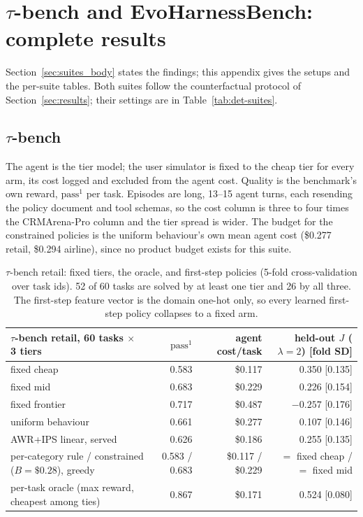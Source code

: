 \documentclass[10pt]{article}
\begin{document}
\section{$\tau$-bench and EvoHarnessBench: complete results}
\label{sec:suites}

Section~\ref{sec:suites_body} states the findings; this appendix gives the setups and the per-suite tables. Both suites follow the counterfactual protocol of Section~\ref{sec:results}; their settings are in Table~\ref{tab:det-suites}.

\subsection{$\tau$-bench}

The agent is the tier model; the user simulator is fixed to the cheap tier for every arm, its cost logged and excluded from the agent cost. Quality is the benchmark's own reward, $\mathrm{pass}^1$ per task. Episodes are long, 13--15 agent turns, each resending the policy document and tool schemas, so the cost column is three to four times the CRMArena-Pro column and the tier spread is wider. The budget for the constrained policies is the uniform behaviour's own mean agent cost (\$0.277 retail, \$0.294 airline), since no product budget exists for this suite.

\begin{table}[htbp]\centering\small
\begin{tabular}{lrrr}\toprule
$\tau$-bench retail, 60 tasks $\times$ 3 tiers & $\mathrm{pass}^1$ & agent cost/task & held-out $J$ ($\lambda=2$) [fold SD] \\\midrule
fixed cheap & 0.583 & \$0.117 & 0.350 [0.135] \\
fixed mid & 0.683 & \$0.229 & 0.226 [0.154] \\
fixed frontier & 0.717 & \$0.487 & $-0.257$ [0.176] \\
uniform behaviour & 0.661 & \$0.277 & 0.107 [0.146] \\
AWR+IPS linear, served & 0.626 & \$0.186 & 0.255 [0.135] \\
per-category rule / constrained ($B=\$0.28$), greedy & 0.583 / 0.683 & \$0.117 / \$0.229 & $=$ fixed cheap / $=$ fixed mid \\
per-task oracle (max reward, cheapest among ties) & 0.867 & \$0.171 & 0.524 [0.080] \\\bottomrule
\end{tabular}
\caption{$\tau$-bench retail: fixed tiers, the oracle, and first-step policies (5-fold cross-validation over task ids). 52 of 60 tasks are solved by at least one tier and 26 by all three. The first-step feature vector is the domain one-hot only, so every learned first-step policy collapses to a fixed arm.}
\label{tab:taubench}
\end{table}
\end{document}
